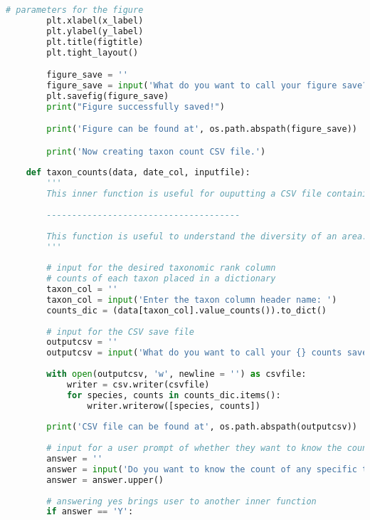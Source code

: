 \documentclass[letterpaper]{article}
\begin{document}
\begin{lstlisting}[language=Python]
        # parameters for the figure
        plt.xlabel(x_label)
        plt.ylabel(y_label)
        plt.title(figtitle)
        plt.tight_layout()

        figure_save = ''
        figure_save = input('What do you want to call your figure save? ')
        plt.savefig(figure_save)
        print("Figure successfully saved!")

        print('Figure can be found at', os.path.abspath(figure_save))

        print('Now creating taxon count CSV file.')
    
    def taxon_counts(data, date_col, inputfile):
        ''' 
        This inner function is useful for ouputting a CSV file containing the counts of a desired taxonomic rank. For example, if the user specifies the family taxonomic rank, then a CSV file will be created that gives the counts of each family in the occurrence dataset.
        
        --------------------------------------
        
        This function is useful to understand the diversity of an area. An easy way to study the diversity of an area is to know what species are the most common or rare.
        '''
        
        # input for the desired taxonomic rank column
        # counts of each taxon placed in a dictionary
        taxon_col = ''
        taxon_col = input('Enter the taxon column header name: ')
        counts_dic = (data[taxon_col].value_counts()).to_dict()
        
        # input for the CSV save file
        outputcsv = ''
        outputcsv = input('What do you want to call your {} counts save?'.format(taxon_col))
    
        with open(outputcsv, 'w', newline = '') as csvfile:
            writer = csv.writer(csvfile)
            for species, counts in counts_dic.items():
                writer.writerow([species, counts])
                
        print('CSV file can be found at', os.path.abspath(outputcsv))
        
        # input for a user prompt of whether they want to know the count of a specific taxon
        answer = ''
        answer = input('Do you want to know the count of any specific taxon? Answer with Y or N.')
        answer = answer.upper()
        
        # answering yes brings user to another inner function
        if answer == 'Y':
            

\end{lstlisting}
\end{document}
